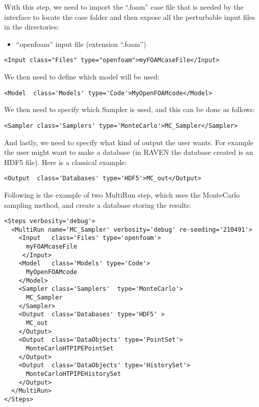 With this step, we need to import the ``.foam'' case file that is needed by the interface to locate the case folder and then expose all the perturbable input files in the  directories:
\begin{itemize}
  \item ``openfoam'' input file (extension ``.foam'')
\end{itemize}
\begin{lstlisting}[style=XML,morekeywords={name,class,type}]
    <Input class="Files" type="openfoam">myFOAMcaseFile</Input>
\end{lstlisting}

We then need to define which model will be used:
\begin{lstlisting}[style=XML]
    <Model  class='Models' type='Code'>MyOpenFOAMcode</Model>
\end{lstlisting}
We then need to specify which Sampler is used, and this can be done as follows:
\begin{lstlisting}[style=XML]
    <Sampler class='Samplers' type='MonteCarlo'>MC_Sampler</Sampler>
\end{lstlisting}
And lastly, we need to specify what kind of output the user wants.
%
For example the user might want to make a database (in RAVEN the database
created is an HDF5 file).
%
Here is a classical example:
\begin{lstlisting}[style=XML,morekeywords={class,type}]
    <Output  class='Databases' type='HDF5'>MC_out</Output>
\end{lstlisting}

Following is the example of two MultiRun step, which uses the MonteCarlo sampling
method, and create a database storing the results:
\begin{lstlisting}[style=XML]
<Steps verbosity='debug'>
  <MultiRun name='MC_Sampler' verbosity='debug' re-seeding='210491'>
    <Input   class='Files' type='openfoam'>
      myFOAMcaseFile
     </Input>
    <Model   class='Models' type='Code'>
      MyOpenFOAMcode
    </Model>
    <Sampler class='Samplers'  type='MonteCarlo'>
      MC_Sampler
    </Sampler>
    <Output  class='Databases' type='HDF5' >
      MC_out
    </Output>
    <Output  class='DataObjects' type='PointSet'>
      MonteCarloHTPIPEPointSet
    </Output>
    <Output  class='DataObjects' type='HistorySet'>
      MonteCarloHTPIPEHistorySet
    </Output>
  </MultiRun>
</Steps>
\end{lstlisting}

